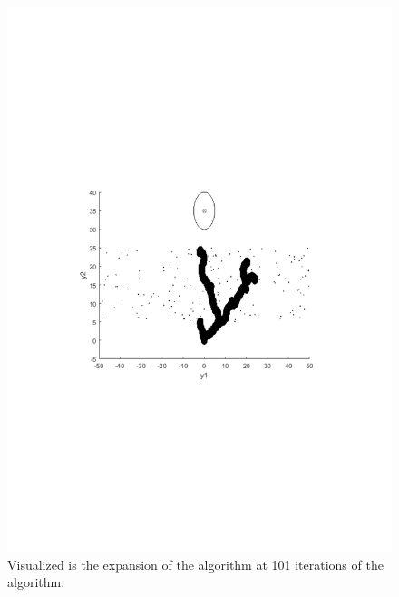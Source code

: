 \begin{figure}[!t]
  \centering
  \begin{minipage}[c]{.9\columnwidth}
  \includegraphics[scale=.5, trim={5cm, 9cm, 5cm, 7cm}, clip]{figures/experiments/rrtfunnel-101samples.pdf}
  \caption[The expansion of the \rrtfunnel algorithm at 1, and 101 iterations]{Visualized is the expansion of the \rrtfunnel algorithm at 101 iterations of the algorithm.}
  \end{minipage}

\end{figure}
